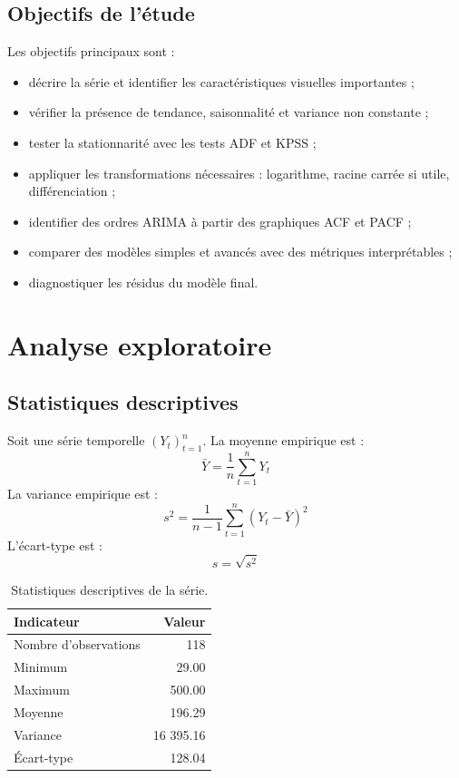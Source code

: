\documentclass[12pt,a4paper]{report}
\begin{document}
\section{Objectifs de l'étude}
Les objectifs principaux sont :
\begin{itemize}
    \item décrire la série et identifier les caractéristiques visuelles importantes ;
    \item vérifier la présence de tendance, saisonnalité et variance non constante ;
    \item tester la stationnarité avec les tests ADF et KPSS ;
    \item appliquer les transformations nécessaires : logarithme, racine carrée si utile, différenciation ;
    \item identifier des ordres ARIMA à partir des graphiques ACF et PACF ;
    \item comparer des modèles simples et avancés avec des métriques interprétables ;
    \item diagnostiquer les résidus du modèle final.
\end{itemize}

\chapter{Analyse exploratoire}
\section{Statistiques descriptives}
Soit une série temporelle $(Y_t)_{t=1}^n$. La moyenne empirique est :
\[
\bar{Y} = \frac{1}{n}\sum_{t=1}^n Y_t
\]
La variance empirique est :
\[
s^2 = \frac{1}{n-1}\sum_{t=1}^n (Y_t - \bar{Y})^2
\]
L'écart-type est :
\[
s = \sqrt{s^2}
\]

\begin{table}[H]
\centering
\begin{tabular}{lr}
\toprule
Indicateur & Valeur \\
\midrule
Nombre d'observations & 118 \\
Minimum & 29.00 \\
Maximum & 500.00 \\
Moyenne & 196.29 \\
Variance & 16 395.16 \\
Écart-type & 128.04 \\
\bottomrule
\end{tabular}
\caption{Statistiques descriptives de la série.}
\end{table}
\end{document}
